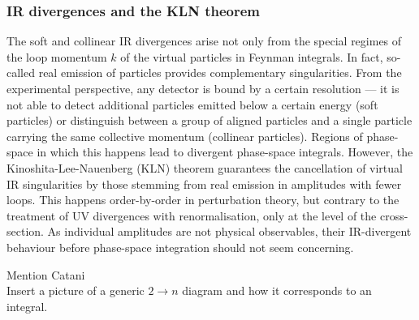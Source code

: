 \documentclass[main.tex]{subfiles}
\begin{document}
\subsubsection{IR divergences and the KLN theorem}
The soft and collinear IR divergences arise not only from the special regimes of the loop momentum $k$ of the virtual particles in Feynman integrals. In fact, so-called real emission of particles provides complementary singularities. From the experimental perspective, any detector is bound by a certain resolution --- it is not able to detect additional particles emitted below a certain energy (soft particles) or distinguish between a group of aligned particles and a single particle carrying the same collective momentum (collinear particles). Regions of phase-space in which this happens lead to divergent phase-space integrals. However, the Kinoshita-Lee-Nauenberg (KLN) theorem guarantees the cancellation of virtual IR singularities by those stemming from real emission in amplitudes with fewer loops\cite{10.1063/1.1724268, PhysRev.133.B1549}. This happens order-by-order in perturbation theory, but contrary to the treatment of UV divergences with renormalisation, only at the level of the cross-section. As individual amplitudes are not physical observables, their IR-divergent behaviour before phase-space integration should not seem concerning.

Mention Catani \\
Insert a picture of a generic $2\rightarrow n$ diagram and how it corresponds to an integral. \\
\end{document}
